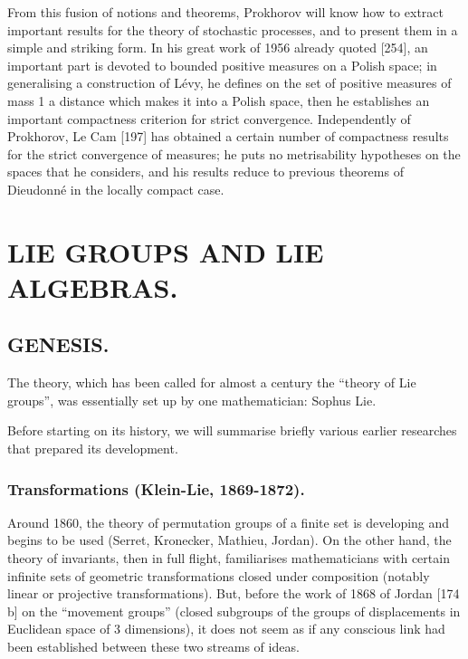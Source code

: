 From this fusion of notions and theorems, Prokhorov will know how to extract important results for the theory of stochastic processes, and to present them in a simple and striking form. In his great work of 1956 already quoted {[}254{]}, an important part is devoted to bounded positive measures on a Polish space; in generalising a construction of Lévy, he defines on the set of positive measures of mass 1 a distance which makes it into a Polish space, then he establishes an important compactness criterion for strict convergence. Independently of Prokhorov, Le Cam {[}197{]} has obtained a certain number of compactness results for the strict convergence of measures; he puts no metrisability hypotheses on the spaces that he considers, and his results reduce to previous theorems of Dieudonné in the locally compact case.

\chapter{LIE GROUPS AND LIE ALGEBRAS.}

\section{GENESIS.}

The theory, which has been called for almost a century the ``theory of Lie groups'', was essentially set up by one mathematician: Sophus Lie.

Before starting on its history, we will summarise briefly various earlier researches that prepared its development.

\subsection{Transformations (Klein-Lie, 1869-1872).}


Around 1860, the theory of permutation groups of a finite set is developing and begins to be used (Serret, Kronecker, Mathieu, Jordan). On the other hand, the theory of invariants, then in full flight, familiarises mathematicians with certain infinite sets of geometric transformations closed under composition (notably linear or projective transformations). But, before the work of 1868 of Jordan {[}174 b{]} on the ``movement groups'' (closed subgroups of the groups of displacements in Euclidean space of 3 dimensions), it does not seem as if any conscious link had been established between these two streams of ideas.

